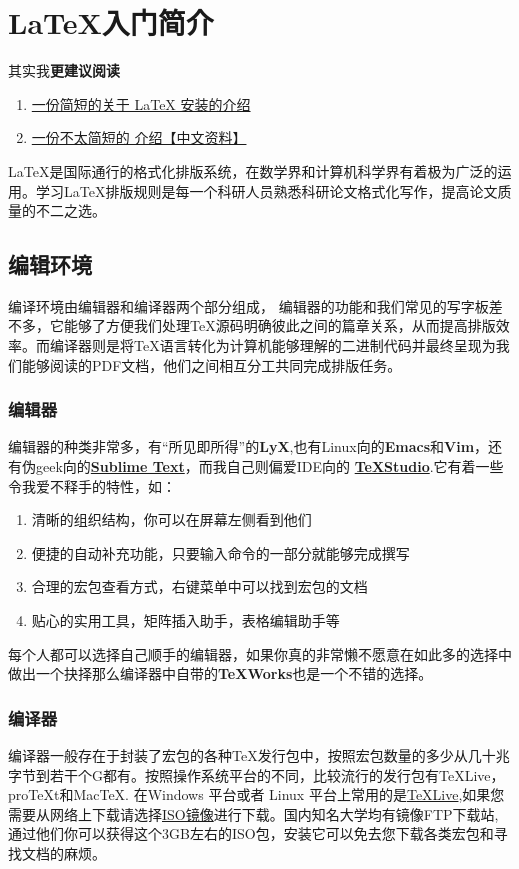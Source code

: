 \section{\LaTeX 入门简介}

其实我\textbf{更建议阅读} 
\begin{enumerate}
\item \textcolor{blue}{ \href{https://github.com/OsbertWang/install-latex}{一份简短的关于 LaTeX 安装的介绍}}

\item \textcolor{blue}{ \href{http://mirrors.ctan.org/info/lshort/chinese/lshort-zh-cn.pdf}{一份不太简短的 \LaTeXe 介绍【中文资料】}}
\end{enumerate}

\LaTeX 是国际通行的格式化排版系统，在数学界和计算机科学界有着极为广泛的运用。学习\LaTeX 排版规则是每一个科研人员熟悉科研论文格式化写作，提高论文质量的不二之选。
\subsection{编辑环境}
编译环境由编辑器和编译器两个部分组成， 编辑器的功能和我们常见的写字板差不多，它能够了方便我们处理\TeX 源码明确彼此之间的篇章关系，从而提高排版效率。而编译器则是将\TeX 语言转化为计算机能够理解的二进制代码并最终呈现为我们能够阅读的PDF文档，他们之间相互分工共同完成排版任务。
\subsubsection{编辑器}
编辑器的种类非常多，有“所见即所得”的\textbf{LyX},也有Linux向的\textbf{Emacs}和\textbf{Vim}，还有伪geek向的\href{http://www.sublimetext.com/}{\textbf{Sublime Text}}，而我自己则偏爱IDE向的
\href{http://texstudio.sourceforge.net/}{\textbf{\TeX Studio}}.它有着一些令我爱不释手的特性，如：
\begin{enumerate}
\item 清晰的组织结构，你可以在屏幕左侧看到他们
\item 便捷的自动补充功能，只要输入命令的一部分就能够完成撰写
\item 合理的宏包查看方式，右键菜单中可以找到宏包的文档
\item 贴心的实用工具，矩阵插入助手，表格编辑助手等
\end{enumerate}

每个人都可以选择自己顺手的编辑器，如果你真的非常懒不愿意在如此多的选择中做出一个抉择那么编译器中自带的\textbf{\TeX Works}也是一个不错的选择。
\subsubsection{编译器}
编译器一般存在于封装了宏包的各种\TeX 发行包中，按照宏包数量的多少从几十兆字节到若干个G都有。按照操作系统平台的不同，比较流行的发行包有\TeX Live，pro\TeX t和Mac\TeX . 在Windows 平台或者 Linux 平台上常用的是\href{https://www.tug.org/texlive/}{\TeX Live},如果您需要从网络上下载请选择\href{https://www.tug.org/texlive/acquire-iso.html}{ISO镜像}进行下载。国内知名大学均有镜像FTP下载站,通过他们你可以获得这个3GB左右的ISO包，安装它可以免去您下载各类宏包和寻找文档的麻烦。
